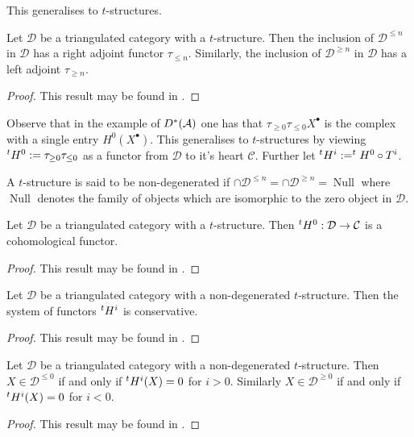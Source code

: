 This generalises to $t$-structures.
\begin{proposition}
 Let $\mathcal{D}$ be a triangulated category with a $t$-structure.
 Then the inclusion of $\mathcal{D}^{\leq n}$ in $\mathcal{D}$ has a right adjoint functor $\tau_{\leq n}$.
 Similarly, the inclusion of $\mathcal{D}^{\geq n}$ in $\mathcal{D}$ has a left adjoint $\tau_{\geq n}$.
\end{proposition}
\begin{proof}
  This result may be found in \cite[Chapter 5]{dimca2004sheaves}.
\end{proof}
Observe that in the example of $D^*(\AA)$ one has that $\tau_{\geq 0} \tau_{\leq 0} X^\bullet$ is the complex with a single entry $H^0(X^\bullet)$.
This generalises to $t$-structures by viewing $\tH^0:= \tau_{\geq 0}\tau_{\leq 0}$ as a functor from $\mathcal{D}$ to it's heart $\mathcal{C}$.
Further let $\tH^i:= \tH^0 \circ T^i$.
\begin{definition}
 A $t$-structure is said to be non-degenerated if $\cap \mathcal{D}^{\leq n} = \cap \mathcal{D}^{\geq n}= \operatorname{Null}$ where $\operatorname{Null}$ denotes the family of objects which are isomorphic to the zero object in $\mathcal{D}$.
\end{definition}
\begin{proposition}
 Let $\mathcal{D}$ be a triangulated category with a $t$-structure. Then $\tH^0:\mathcal{D}\to \mathcal{C}$ is a cohomological functor.
\end{proposition}
\begin{proof}
  This result may be found in \cite[Chapter 5]{dimca2004sheaves}.
\end{proof}
\begin{proposition}
 Let $\mathcal{D}$ be a triangulated category with a non-degenerated $t$-structure. Then the system of functors $\tH^i$ is conservative.
\end{proposition}
\begin{proof}
  This result may be found in \cite[Chapter 5]{dimca2004sheaves}.
\end{proof}
\begin{proposition}\label{prop: tStructCohomD}
  Let $\mathcal{D}$ be a triangulated category with a non-degenerated $t$-structure.
  Then $X\in \mathcal{D}^{\leq 0}$ if and only if $\tH^i(X) = 0$ for $i>0$. Similarly $X\in \mathcal{D}^{\geq 0}$ if and only if $\tH^i(X)= 0$ for $i<0$.
\end{proposition}
\begin{proof}
  This result may be found in \cite[Chapter 5]{dimca2004sheaves}.
\end{proof}

